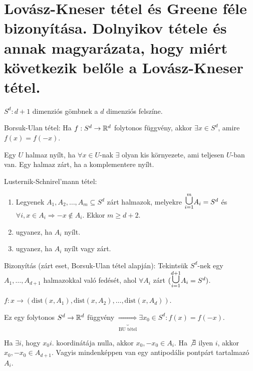 \chapter{Lovász-Kneser tétel és Greene féle bizonyítása. Dolnyikov tétele és annak magyarázata, hogy miért következik belőle a Lovász-Kneser tétel.}

\begin{notation}
  $S^d: d+1$ dimenziós gömbnek a $d$ dimenziós felszíne.
\end{notation}

\begin{thm} Borsuk-Ulan tétel:
  Ha $f: S^d \rightarrow \mathbb{R}^d$ folytonos függvény, akkor $\exists x \in S^d$, amire $f(x) = f(-x)$.
\end{thm}

\begin{dfn}
  Egy $U$ halmaz nyílt, ha $\forall x \in U$-nak $\exists$ olyan kis környezete, ami teljesen $U$-ban van. Egy halmaz zárt, ha a komplementere nyílt.
\end{dfn}

\begin{thm} Lusternik-Schnirel'mann tétel:
  \begin{enumerate}
    \item Legyenek $A_1, A_2, \dots, A_m \subseteq S^d$ zárt halmazok, melyekre
    $\overset{m}{\underset{i=1}{\text{\LARGE $\cup$}}} A_i = S^d$ és $\forall i, x \in A_i \Rightarrow -x \not \in A_i$. Ekkor $m \geq d + 2$.
    \item ugyanez, ha $A_i$ nyílt.
    \item ugyanez, ha $A_i$ nyílt vagy zárt.
  \end{enumerate}
\end{thm}

Bizonyítás (zárt eset, Borsuk-Ulan tétel alapján):
Tekintsük $S^d$-nek egy $A_1, \dots, A_{d+1}$ halmazokkal való fedését, ahol $\forall A_i$ zárt $(\overset{d+1}{\underset{i=1}{\text{\LARGE $\cup$}}} A_i = S^d)$.

$f: x \rightarrow (\text{dist}(x, A_1), \text{dist}(x, A_2), \dots, \text{dist}(x, A_d))$.

Ez egy folytonos $S^d \rightarrow \mathbb{R}^d$ függvény $\underbrace{\Rightarrow}_{\text{BU tétel}} \exists x_0 \in S^d: f(x) = f(-x)$.

Ha $\exists i$, hogy $x_0 i.$ koordinátája nulla, akkor $x_0, -x_0 \in A_i$. Ha $\not \exists$ ilyen $i$, akkor $x_0, -x_0 \in A_{d+1}$. Vagyis mindenképpen van egy antipodális pontpárt tartalmazó $A_i$.
\QED

